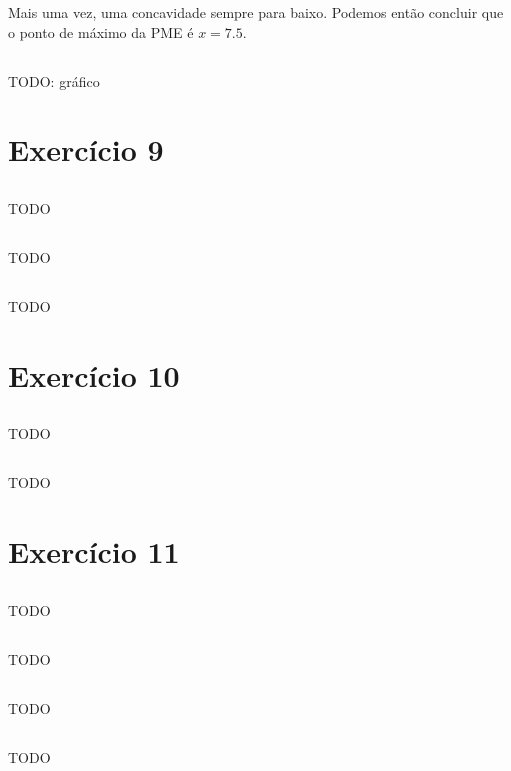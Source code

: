 \documentclass{article}
\begin{document}
Mais uma vez, uma concavidade sempre para baixo. Podemos então concluir que o
ponto de máximo da PME é \(x=7.5\).

\subsection{}

TODO: gráfico

\section{Exercício 9}
\subsection{}
TODO
\subsection{}
TODO
\subsection{}
TODO

\section{Exercício 10}
\subsection{}
TODO
\subsection{}
TODO

\section{Exercício 11}
\subsection{}
TODO
\subsection{}
TODO
\subsection{}
TODO
\subsection{}
TODO
\end{document}
